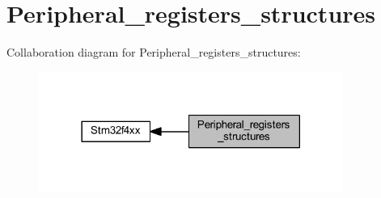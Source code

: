 \hypertarget{group___peripheral__registers__structures}{}\section{Peripheral\+\_\+registers\+\_\+structures}
\label{group___peripheral__registers__structures}
Collaboration diagram for Peripheral\+\_\+registers\+\_\+structures\+:
\nopagebreak
\begin{figure}[H]
\begin{center}
\leavevmode
\includegraphics[width=282pt]{group___peripheral__registers__structures}
\end{center}
\end{figure}
